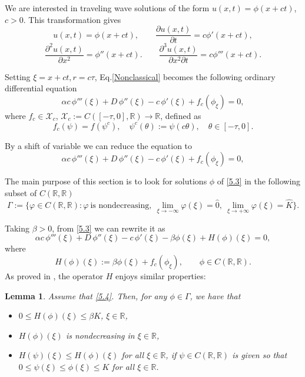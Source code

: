 \documentclass[12pt,letterpaper]{amsart}
\newtheorem{lemma}[theorem]{Lemma}
\theoremstyle{definition}
\theoremstyle{remark}
\numberwithin{equation}{section}
\begin{document}
  
 We are interested in traveling wave solutions of the form $u(x,t) = \phi(x+ct)$, $c>0$. 
 This transformation gives
 $$
 u(x,t) = \phi(x+ct),
\qquad
 \frac{\partial u(x,t)}{\partial t} = c\phi'(x+ct),
 $$
 $$
 \frac{\partial^2 u(x,t)}{\partial x^2} = \phi''(x+ct).
\qquad
 	 \frac{\partial^3 u(x, t )}{\partial x^2\partial t} = c\phi'''(x+ct).
 $$
 
 Setting $\xi = x+ct, r = c\tau$, Eq.\eqref{Nonclassical} becomes the following ordinary differential equation
 \begin{equation} \label{5.2}
 	\alpha c\,\phi'''(\xi) + D\,\phi''(\xi) -c\,\phi'(\xi)  +   f_c(\phi_\xi) = 0,
 \end{equation}
 where $f_c \in \mathcal{X}_c$, $ \mathcal{X}_c := C([-\tau,0], \mathbb{R}) \to \mathbb{R}$, defined as
 $$
 f_c(\psi) = f(\psi^c), \quad \psi^c(\theta) := \psi(c\theta), \quad \theta \in [-\tau,0].
 $$
 
 By a shift of variable we can reduce the equation to
 \begin{equation}\label{5.3}
 		\alpha c\,\phi'''(\xi) + D\,\phi''(\xi) -c\,\phi'(\xi)    + f_c(\phi_{\xi}) = 0,
 \end{equation}
 
 The main purpose of this section is to look for solutions $\phi$ of \eqref{5.3} in the following subset of $C(\mathbb{R},\mathbb{R})$
 $$
\Gamma := \Big\{\varphi \in C(\mathbb{R},\mathbb{R}) : \varphi \ \text{is nondecreasing},\ 
\lim_{\xi \to -\infty}\varphi(\xi) = \hat 0,\ 
\lim_{\xi \to +\infty}\varphi(\xi) = \hat K \Big\}.
$$


Taking $\beta>0$, from \eqref{5.3} we can rewrite it as
\begin{equation}\label{wave1}
	\alpha c\,\phi'''(\xi) + D\,\phi''(\xi) - c\,\phi'(\xi) - \beta \phi(\xi) + H(\phi)(\xi) = 0,
\end{equation}
where
$$
H(\phi)(\xi) := \beta \phi(\xi) + f_c(\phi_\xi), \qquad \phi \in C(\mathbb{R},\mathbb{R}).
$$
As proved in \cite{wuzou}, the operator $H$ enjoys similar properties:
\begin{lemma} 
	Assume that \eqref{5.4}. Then, for any $\phi \in \Gamma$, we have that
	\begin{itemize}
		\item[(i)] $ 0 \leq  H(\phi)(\xi) \leq \beta K$, $\xi \in \mathbb{R}$,
		\item[(ii)] $H(\phi)(\xi)$ is nondecreasing in $\xi \in \mathbb{R}$,
		\item[(iii)] $H(\psi)(\xi) \leq H(\phi)(\xi)$ for all $\xi \in \mathbb{R}$, if $\psi \in C(\mathbb{R},\mathbb{R})$ is given so that $0 \leq \psi(\xi) \leq \phi(\xi) \leq K$ for all $\xi \in \mathbb{R}$.
	\end{itemize}
\end{lemma}
\end{document}
